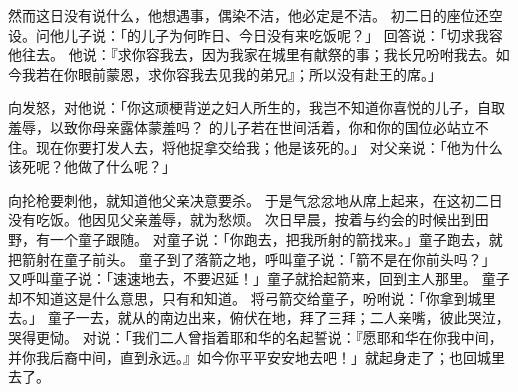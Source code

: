 {\par }{\PP {}然而这日{}没有说什么，他想{}遇事，偶染不洁，他必定是不洁。
初二日{}的座位还空设。{}问他儿子{}说：「{}的儿子为何昨日、今日没有来吃饭呢？」
回答{}说：「{}切求我容他往{}去。
他说：『求你容我去，因为我家在城里有献祭的事；我长兄吩咐我去。如今我若在你眼前蒙恩，求你容我去见我的弟兄』；所以{}没有赴王的席。」
\par }{\PP {}向{}发怒，对他说：「你这顽梗背逆之妇人所生的，我岂不知道你喜悦{}的儿子，自取羞辱，以致你母亲露体蒙羞吗？
的儿子若在世间活着，你和你的国位必站立不住。现在你要打发人去，将他捉拿交给我；他是该死的。」
对父亲{}说：「他为什么该死呢？他做了什么呢？」
\par }{\PP {}向{}抡枪要刺他，{}就知道他父亲决意要杀{}。
于是{}气忿忿地从席上起来，在这初二日没有吃饭。他因见父亲羞辱{}，就为{}愁烦。
次日早晨，{}按着与{}约会的时候出到田野，有一个童子跟随。
对童子说：「你跑去，把我所射的箭找来。」童子跑去，{}就把箭射在童子前头。
童子到了{}落箭之地，{}呼叫童子说：「箭不是在你前头吗？」
又呼叫童子说：「速速地去，不要迟延！」童子就拾起箭来，回到主人那里。
童子却不知道这是什么意思，只有{}和{}知道。
将弓箭交给童子，吩咐说：「你拿到城里去。」
童子一去，{}就从{}的南边出来，俯伏在地，拜了三拜；二人亲嘴，彼此哭泣，{}哭得更恸。
对{}说：「我们二人曾指着耶和华的名起誓说：『愿耶和华在你我中间，并你我后裔中间{}，直到永远。』如今你平平安安地去吧！」{}就起身走了；{}也回城里去了。

}
